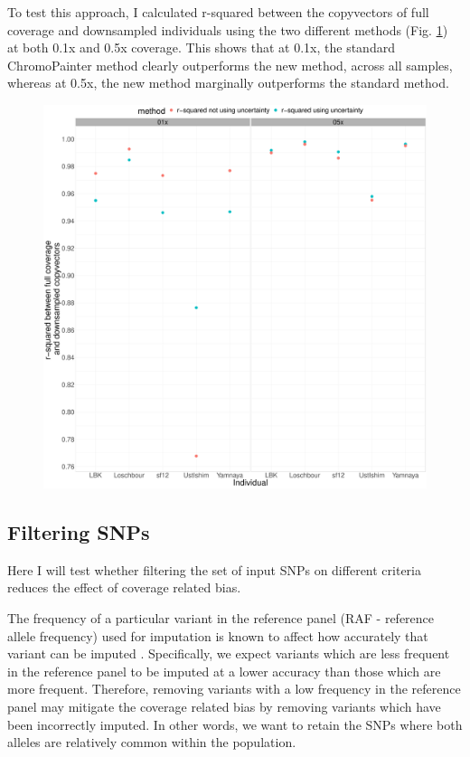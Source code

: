 To test this approach, I calculated r-squared between the copyvectors of full coverage and downsampled individuals using the two different methods (Fig. \ref{fig:uncertainty_v_noUncertainty_0.5x_0.1x}) at both 0.1x and 0.5x coverage. This shows that at 0.1x, the standard ChromoPainter method clearly outperforms the new method, across all samples, whereas at 0.5x, the new method marginally outperforms the standard method. 


\begin{figure}[htp]
    \centering
    \includegraphics[width=1.0\textwidth]{../images/chapter1/uncertainty_v_noUncertainty_0.5x_0.1x.pdf}
    \caption{}
    \label{fig:uncertainty_v_noUncertainty_0.5x_0.1x}
\end{figure}


\subsection{Filtering SNPs}

Here I will test whether filtering the set of input SNPs on different criteria reduces the effect of coverage related bias. 

The frequency of a particular variant in the reference panel (RAF - reference allele frequency) used for imputation is known to affect how accurately that variant can be imputed \cite{rubinacci2021efficient, delaneau2018integrative, Browning2016, hui2020evaluating}. Specifically, we expect variants which are less frequent in the reference panel to be imputed at a lower accuracy than those which are more frequent. Therefore, removing variants with a low frequency in the reference panel may mitigate the coverage related bias by removing variants which have been incorrectly imputed. In other words, we want to retain the SNPs where both alleles are relatively common within the population. 

